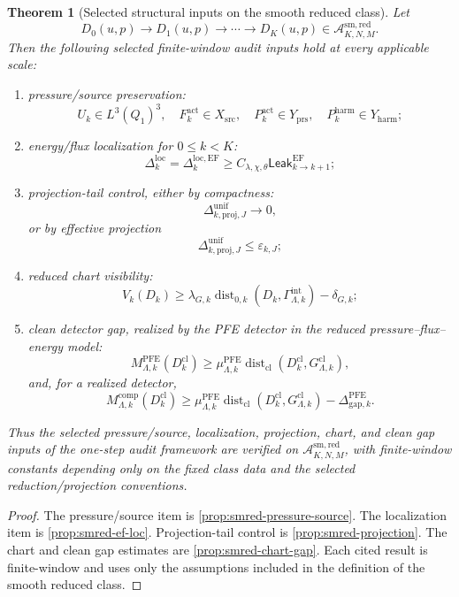 \documentclass[11pt]{article}
\numberwithin{equation}{section}
\theoremstyle{plain}
\newtheorem{theorem}{Theorem}[section]
\theoremstyle{definition}
\theoremstyle{remark}
\newcommand{\cl}{\mathrm{cl}}
\newcommand{\intg}{\mathrm{int}}
\newcommand{\comp}{\mathrm{comp}}
\newcommand{\prs}{\mathrm{prs}}
\newcommand{\harm}{\mathrm{harm}}
\newcommand{\proj}{\mathrm{proj}}
\newcommand{\locerr}{\mathrm{loc}}
\newcommand{\gap}{\mathrm{gap}}
\newcommand{\Leak}{\mathsf{Leak}}
\newcommand{\Dist}{\operatorname{dist}}
\newcommand{\A}{\mathcal A}
\begin{document}
\begin{theorem}[Selected structural inputs on the smooth reduced class]\label{thm:smred-selected-inputs}
Let
\[
  D_0(u,p)\to D_1(u,p)\to\cdots\to D_K(u,p)
  \in
  \A_{K,N,M}^{\mathrm{sm,red}}.
\]
Then the following selected finite-window audit inputs hold at every
applicable scale:
\begin{enumerate}[label=(\alph*)]
  \item pressure/source preservation:
  \[
    U_k\in L^3(Q_1)^3,\quad
    F_k^{\mathrm{act}}\in X_{\mathrm{src}},\quad
    P_k^{\mathrm{act}}\in Y_{\prs},\quad
    P_k^{\harm}\in Y_{\harm};
  \]
  \item energy/flux localization for \(0\le k<K\):
  \[
    \Delta_k^{\locerr}
    =
    \Delta_k^{\locerr,\mathrm{EF}}
    \ge
    C_{\lambda,\chi,\theta}\Leak_{k\to k+1}^{\mathrm{EF}};
  \]
  \item projection-tail control, either by compactness:
  \[
    \Delta_{k,\proj,J}^{\mathrm{unif}}\to0,
  \]
  or by effective projection
  \[
    \Delta_{k,\proj,J}^{\mathrm{unif}}\le\varepsilon_{k,J};
  \]
  \item reduced chart visibility:
  \[
    V_k(D_k)
    \ge
    \lambda_{G,k}\Dist_{0,k}(D_k,\Gamma_{\Lambda,k}^{\intg})
    -
    \delta_{G,k};
  \]
  \item clean detector gap, realized by the PFE detector in the reduced
  pressure--flux--energy model:
  \[
    M_{\Lambda,k}^{\mathrm{PFE}}(D_k^{\cl})
    \ge
    \mu_{\Lambda,k}^{\mathrm{PFE}}
    \Dist_{\cl}(D_k^{\cl},G_{\Lambda,k}^{\cl}),
  \]
  and, for a realized detector,
  \[
    M_{\Lambda,k}^{\comp}(D_k^{\cl})
    \ge
    \mu_{\Lambda,k}^{\mathrm{PFE}}
    \Dist_{\cl}(D_k^{\cl},G_{\Lambda,k}^{\cl})
    -
    \Delta_{\gap,k}^{\mathrm{PFE}}.
  \]
\end{enumerate}
Thus the selected pressure/source, localization, projection, chart, and clean
gap inputs of the one-step audit framework are verified on
\(\A_{K,N,M}^{\mathrm{sm,red}}\), with finite-window constants depending
only on the fixed class data and the selected reduction/projection
conventions.
\end{theorem}

\begin{proof}
The pressure/source item is \cref{prop:smred-pressure-source}.  The
localization item is \cref{prop:smred-ef-loc}.  Projection-tail control is
\cref{prop:smred-projection}.  The chart and clean gap estimates are
\cref{prop:smred-chart-gap}.  Each cited result is finite-window and uses only
the assumptions included in the definition of the smooth reduced class.
\end{proof}
\end{document}
